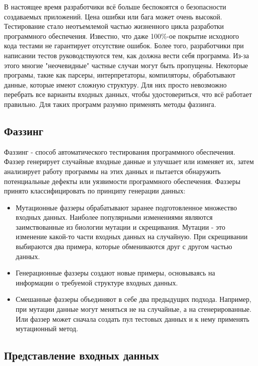 \documentclass[a4paper]{article}
\begin{document}
В настоящее время разработчики всё больше беспокоятся о безопасности создаваемых приложений. Цена ошибки или бага может очень высокой. Тестирование стало неотъемлемой частью жизненного цикла разработки программного обеспечения. Известно, что даже 100\%-ое покрытие исходного кода тестами не гарантирует отсутствие ошибок. Более того, разработчики при написании тестов руководствуются тем, как должна вести себя программа. Из-за этого многие "неочевидные" частные случаи могут быть пропущены. Некоторые програмы, такие как парсеры, интерпретаторы, компиляторы, обработывают данные, которые имеют сложную структуру. Для них просто невозможно перебрать все варианты входных данных, чтобы удостовериться, что всё работает правильно. Для таких программ разумно применять методы фаззинга.

\subsection{Фаззинг}
\indent

Фаззинг - способ автоматического тестирования программного обеспечения. Фаззер генерирует случайные входные данные и улучшает или изменяет их, затем анализирует работу программы на этих данных и пытается обнаружить потенциальные дефекты или уязвимости программного обеспечения. Фаззеры принято классифицировать по принципу генерации данных:

\begin{itemize}
\item Мутационные фаззеры обрабатывают заранее подготовленное множество входных данных. Наиболее популярными изменениями являются заимствованные из биологии мутации и скрещивания. Мутации - это изменение какой-то части входных данных на случайную. При скрещивании выбираются два примера, которые обмениваются друг с другом частью данных.
\item Генерационные фаззеры создают новые примеры, основываясь на информации о требуемой структуре входных данных. 
\item Смешанные фаззеры объединяют в себе два предыдущих подхода. Например, при мутации данные могут меняться не на случайные, а на сгенерированные. Или фаззер может сначала создать пул тестовых данных и к нему применять мутационный метод. 
\end{itemize}

\subsection{Представление входных данных}
\indent
\end{document}
